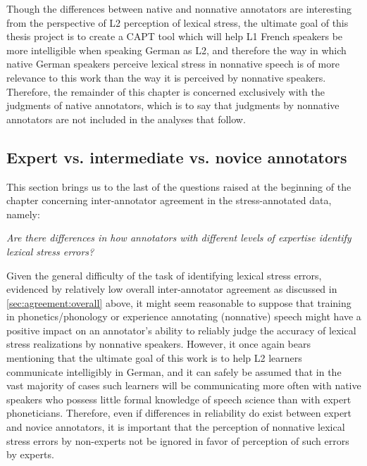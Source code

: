 		Though the differences between native and nonnative annotators are interesting from the perspective of L2 perception of lexical stress, the ultimate goal of this thesis project is to create a CAPT tool which will help L1 French speakers be more intelligible when speaking German as L2, and therefore the way in which native German speakers perceive lexical stress in nonnative speech is of more relevance to this work than the way it is perceived by nonnative speakers. Therefore, the remainder of this chapter is concerned exclusively with the judgments of native annotators, which is to say that judgments by nonnative annotators are not included in the analyses that follow.
			
		
		\subsection{Expert vs. intermediate vs. novice annotators}
		\label{sec:agreement:expert}
		
		
		
	This section brings us to the last of the questions raised at the beginning of the chapter concerning inter-annotator agreement in the stress-annotated data, namely:
	
	\textit{Are there differences in how 
	annotators with different levels of expertise
	identify lexical stress errors?}
	
	Given the general difficulty of the task of identifying lexical stress errors, evidenced by relatively low overall inter-annotator agreement as discussed in \cref{sec:agreement:overall} above, it might seem reasonable to suppose that training in phonetics/phonology or experience annotating (nonnative) speech might have a positive impact on an annotator's ability to reliably judge the accuracy of lexical stress realizations by nonnative speakers. However, it once again bears mentioning that the ultimate goal of this work is to help L2 learners communicate intelligibly in German, and it can safely be assumed that in the vast majority of cases such learners will be communicating more often with native speakers who possess little formal knowledge of speech science than with expert phoneticians. Therefore, even if differences in reliability do exist between expert and novice annotators, it is important that the perception of nonnative lexical stress errors by non-experts not be ignored in favor of perception of such errors by experts. 
	

